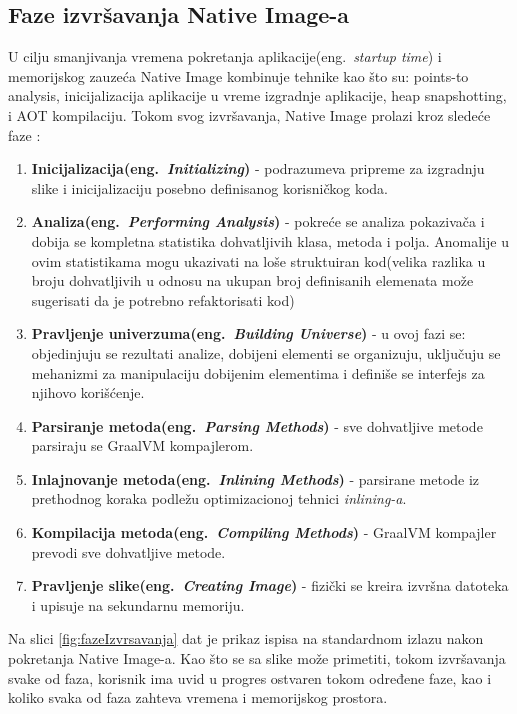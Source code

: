 \documentclass[a4paper]{article}
\begin{document}
\subsection{Faze izvršavanja Native Image-a}
U cilju smanjivanja vremena pokretanja aplikacije(eng.~{\em startup time}) i memorijskog zauzeća Native Image kombinuje tehnike kao što su: points-to analysis, inicijalizacija aplikacije u vreme izgradnje aplikacije, heap snapshotting, i AOT kompilaciju. Tokom svog izvršavanja, Native Image prolazi kroz sledeće faze \cite{FazeIzvrsavanja}:
\begin{enumerate}
    \item \textbf{Inicijalizacija(eng.~{\em Initializing})} - podrazumeva pripreme za izgradnju slike i inicijalizaciju posebno definisanog korisničkog koda.
    \item \textbf{Analiza(eng.~{\em Performing Analysis})} - pokreće se analiza pokazivača i dobija se kompletna statistika dohvatljivih klasa, metoda i polja. Anomalije u ovim statistikama mogu ukazivati na loše struktuiran kod(velika razlika u broju dohvatljivih u odnosu na ukupan broj definisanih elemenata može sugerisati da je potrebno refaktorisati kod)
    \item \textbf{ Pravljenje univerzuma(eng.~{\em Building Universe})} - u ovoj fazi se: objedinjuju se rezultati analize, dobijeni elementi se organizuju, uključuju se mehanizmi za manipulaciju dobijenim elementima i definiše se interfejs za njihovo korišćenje.
    \item \textbf{Parsiranje metoda(eng.~{\em Parsing Methods})} - sve dohvatljive metode parsiraju se GraalVM kompajlerom. 
    \item \textbf{Inlajnovanje metoda(eng.~{\em Inlining Methods})} - parsirane metode iz prethodnog koraka podležu optimizacionoj tehnici \textit{inlining-a}. 
    \item \textbf{Kompilacija metoda(eng.~{\em Compiling Methods})} - GraalVM kompajler prevodi sve dohvatljive metode.
    \item \textbf{Pravljenje slike(eng.~{\em Creating Image})} - fizički se kreira izvršna datoteka i upisuje na sekundarnu memoriju.
\end{enumerate}
Na slici \ref{fig:fazeIzvrsavanja} dat je prikaz ispisa na standardnom izlazu nakon pokretanja Native Image-a. Kao što se sa slike može primetiti, tokom izvršavanja svake od faza, korisnik ima uvid u progres ostvaren tokom određene faze, kao i koliko svaka od faza zahteva vremena i memorijskog prostora. 
\end{document}
